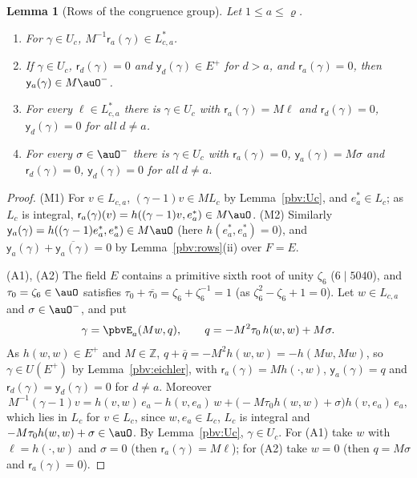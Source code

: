 \documentclass[10pt]{amsart}
\newtheorem{lemma}[theorem]{Lemma}
\theoremstyle{definition}
\theoremstyle{remark}
\newcommand{\Z}{\mathbb Z}
\providecommand{\aubar}[1]{\overline{#1}}
\begin{document}
\begin{lemma}[Rows of the congruence group]\label{pbv:latt}
Let $1\le a\le\varrho$.
\begin{enumerate}
\item[(M1)] For $\gamma\in U_c$, $M^{-1}\mathsf r_a(\gamma)\in L_{c,a}^*$.
\item[(M2)] If $\gamma\in U_c$, $\mathsf r_d(\gamma)=0$ and $\mathsf y_d(\gamma)\in E^+$ for $d>a$, and $\mathsf r_a(\gamma)=0$,
then $\mathsf y_a(\gamma)\in M\auO^-$.
\item[(A1)] For every $\ell\in L_{c,a}^*$ there is $\gamma\in U_c$ with $\mathsf r_a(\gamma)=M\ell$ and $\mathsf
r_d(\gamma)=0$, $\mathsf y_d(\gamma)=0$ for all $d\ne a$.
\item[(A2)] For every $\sigma\in\auO^-$ there is $\gamma\in U_c$ with $\mathsf r_a(\gamma)=0$, $\mathsf y_a(\gamma)=M\sigma$
and $\mathsf r_d(\gamma)=0$, $\mathsf y_d(\gamma)=0$ for all $d\ne a$.
\end{enumerate}
\end{lemma}
\begin{proof}
(M1) For $v\in L_{c,a}$, $(\gamma-1)v\in ML_c$ by Lemma~\ref{pbv:Uc}, and $e_a^*\in L_c$; as $L_c$ is
integral, $\mathsf r_a(\gamma)(v)=h((\gamma-1)v,e_a^*)\in M\auO$. (M2) Similarly $\mathsf y_a(\gamma)=
h((\gamma-1)e_a^*,e_a^*)\in M\auO$ (here $h(e_a^*,e_a^*)=0$), and $\mathsf y_a(\gamma)+\aubar{\mathsf y_a
(\gamma)}=0$ by Lemma~\ref{pbv:rows}(ii) over $F=E$.

(A1), (A2) The field $E$ contains a primitive sixth root of unity $\zeta_6$ ($6\mid5040$), and $\tau_0=\zeta_6
\in\auO$ satisfies $\tau_0+\aubar{\tau_0}=\zeta_6+\zeta_6^{-1}=1$ (as $\zeta_6^2-\zeta_6+1=0$). Let
$w\in L_{c,a}$ and $\sigma\in\auO^-$, and put
\[
\gamma=\pbvE_a(Mw,q),\qquad q=-M^2\tau_0\,h(w,w)+M\sigma .
\]
As $h(w,w)\in E^+$ and $M\in\Z$, $q+\aubar q=-M^2h(w,w)=-h(Mw,Mw)$, so $\gamma\in U(E^+)$ by
Lemma~\ref{pbv:eichler}, with $\mathsf r_a(\gamma)=Mh(\cdot,w)$, $\mathsf y_a(\gamma)=q$ and $\mathsf
r_d(\gamma)=\mathsf y_d(\gamma)=0$ for $d\ne a$. Moreover
\[
M^{-1}(\gamma-1)v=h(v,w)\,e_a-h(v,e_a)\,w+\bigl(-M\tau_0h(w,w)+\sigma\bigr)h(v,e_a)\,e_a ,
\]
which lies in $L_c$ for $v\in L_c$, since $w,e_a\in L_c$, $L_c$ is integral and $-M\tau_0h(w,w)+\sigma\in
\auO$. By Lemma~\ref{pbv:Uc}, $\gamma\in U_c$. For (A1) take $w$ with $\ell=h(\cdot,w)$ and $\sigma=0$
(then $\mathsf r_a(\gamma)=M\ell$); for (A2) take $w=0$ (then $q=M\sigma$ and $\mathsf r_a(\gamma)=0$).
\end{proof}
\end{document}

